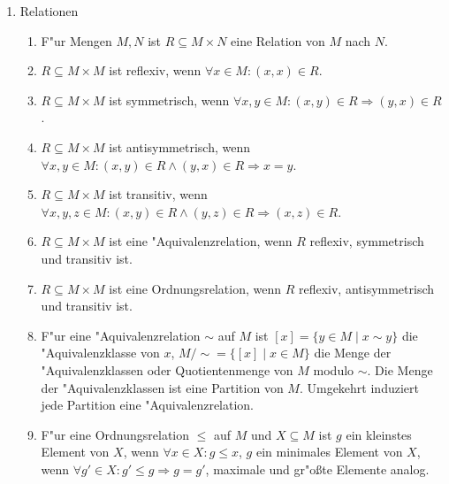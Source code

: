 \begin{enumerate}
\begin{enumerate}
    \item Distributivgesetz: $A\cap (B \cup C) \Leftrightarrow (A\cap B) \cup (A\cap C)$
    \item Distributivgesetz: $A\cup (B \cap C) \Leftrightarrow (A\cup B) \cap (A\cup C)$
    \item DeMorgan: $A\setminus (B\cup C) \Leftrightarrow (A\setminus B) \cap (A\setminus C)$
    \item DeMorgan: $A\setminus (B\cap C) \Leftrightarrow (A\setminus B) \cup (A\setminus C)$
    \item Es ist $\bigcup_{i\in I}A_i = \{x\mid \exists i\in I: x\in A_i\}$. 
    \item Es ist $\bigcap_{i\in I}A_i = \{x\mid\forall i\in I: x\in A_i\}$.
\end{enumerate}
\item Relationen
\begin{enumerate}
    \item F"ur Mengen $M,N$ ist $R\subseteq M\times N$ eine Relation von $M$ nach $N$.
    \item $R\subseteq M\times M$ ist reflexiv, wenn $\forall x\in M: (x,x)\in R$.
    \item $R\subseteq M\times M$ ist symmetrisch, wenn $\forall x,y\in M: (x,y)\in R \Rightarrow (y,x)\in R$.
    \item $R\subseteq M\times M$ ist antisymmetrisch, wenn $\forall x,y\in M: (x,y)\in R \wedge (y,x)\in R \Rightarrow x=y$.
    \item $R\subseteq M\times M$ ist transitiv, wenn $\forall x,y,z\in M: (x,y)\in R \wedge (y,z)\in R \Rightarrow (x,z)\in R$.
    \item $R\subseteq M\times M$ ist eine "Aquivalenzrelation, wenn $R$ reflexiv, symmetrisch und transitiv ist.
    \item $R\subseteq M\times M$ ist eine Ordnungsrelation, wenn $R$ reflexiv, antisymmetrisch und transitiv ist.
    \item F"ur eine "Aquivalenzrelation $\sim$ auf $M$ ist $[x]=\{y\in M\mid x\sim y\}$ die "Aquivalenzklasse von $x$, $M/\sim = \{[x]\mid x\in M\}$ die Menge der "Aquivalenzklassen oder Quotientenmenge von $M$ modulo $\sim$. Die Menge der "Aquivalenzklassen ist eine Partition von $M$. Umgekehrt induziert jede Partition eine "Aquivalenzrelation.
    \item F"ur eine Ordnungsrelation $\leq$ auf $M$ und $X\subseteq M$ ist $g$ ein kleinstes Element von $X$, wenn $\forall x\in X: g\leq x$, $g$ ein minimales Element von $X$, wenn $\forall g'\in X: g'\leq g\Rightarrow g=g'$, maximale und gr"o{\ss}te Elemente analog.

\end{enumerate}
\end{enumerate}
